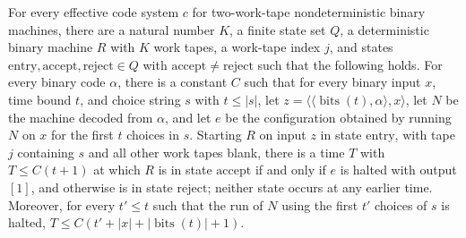 \begin{theorem}
\label{Turing.exists_ndInterpreterCore}
\leanok
{}
For every effective code system $c$ for two-work-tape nondeterministic binary machines,
there are a natural number $K$, a finite state set $Q$, a deterministic binary machine
$R$ with $K$ work tapes, a work-tape index $j$, and states
$\mathrm{entry},\mathrm{accept},\mathrm{reject}\in Q$ with
$\mathrm{accept}\ne\mathrm{reject}$ such that the following holds. For every binary code
$\alpha$, there is a constant $C$ such that for every binary input $x$, time bound $t$,
and choice string $s$ with $t\le |s|$, let
$z=\langle\langle\operatorname{bits}(t),\alpha\rangle,x\rangle$, let $N$ be the machine
decoded from $\alpha$, and let $e$ be the configuration obtained by running $N$ on $x$
for the first $t$ choices in $s$. Starting $R$ on input $z$ in state $\mathrm{entry}$,
with tape $j$ containing $s$ and all other work tapes blank, there is a time $T$ with
$T\le C(t+1)$ at which $R$ is in state $\mathrm{accept}$ if and only if $e$ is halted
with output $[1]$, and otherwise is in state $\mathrm{reject}$; neither state occurs at
any earlier time. Moreover, for every $t'\le t$ such that the run of $N$ using the first
$t'$ choices of $s$ is halted, $T\le C(t'+|x|+|\operatorname{bits}(t)|+1)$.
\end{theorem}
